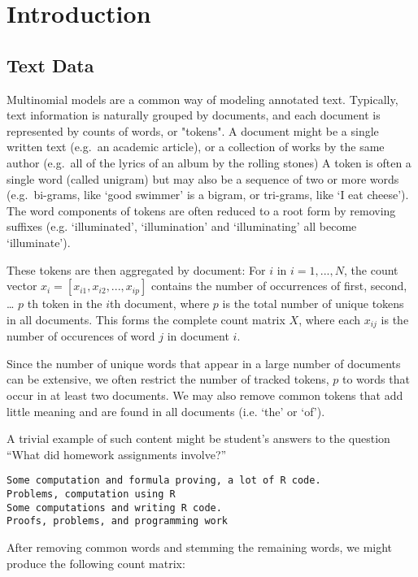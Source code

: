 \documentclass[12pt]{article}
\begin{document}
\section{Introduction}

\subsection{Text Data}


Multinomial models are a common way of modeling annotated text.
Typically, text information is naturally grouped by documents, and each
document is represented by counts of words, or "tokens". A document might be a
single written text (e.g.~an academic article), or a collection of works
by the same author (e.g.~all of the lyrics of an album by the rolling
stones) A token is often a single word (called unigram) but may also be
a sequence of two or more words (e.g.~bi-grams, like `good swimmer' is a
bigram, or tri-grams, like `I eat cheese'). The word components of
tokens are often reduced to a root form by removing suffixes (e.g.
`illuminated', `illumination' and `illuminating' all become
`illuminate').

These tokens are then aggregated by document: For $i$ in $i = 1,...,N$,
the count vector $x_i = [x_{i1}, x_{i2}, ... , x_{ip}]$ contains the
number of occurrences of first, second, \ldots{} $p$ th token in the
$i$th document, where $p$ is the total number of unique tokens in all
documents. This forms the complete count matrix $X$, where each $x_{ij}$
is the number of occurences of word $j$ in document $i$.

Since the number of unique words that appear in a large number of
documents can be extensive, we often restrict the number of tracked
tokens, $p$ to words that occur in at least two documents. We may also
remove common tokens that add little meaning and are found in all
documents (i.e. `the' or `of').

A trivial example of such content might be student's answers to the
question ``What did homework assignments involve?''

\begin{verbatim}
Some computation and formula proving, a lot of R code.
Problems, computation using R
Some computations and writing R code.
Proofs, problems, and programming work
\end{verbatim}

After removing common words and stemming the remaining words, we might
produce the following count matrix:
\end{document}
